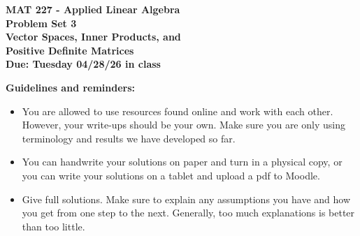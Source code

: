 \documentclass[12pt]{article}
\begin{document}
\begin{center}
\textbf{MAT 227 - Applied Linear Algebra}\\
\medskip
\textbf{Problem Set 3\\ Vector Spaces, Inner Products, and \\Positive Definite Matrices}\\
\medskip
\textbf{Due: {\color{red} Tuesday 04/28/26} in class}
\end{center}



\begin{center}
\underline{\hspace{6.5 in}}
\end{center}


\noindent\textbf{Guidelines and reminders:}
	\begin{itemize}[nosep]
	\item You are allowed to use resources found online and work with each other. However, your write-ups should be your own. Make sure you are only using terminology and results we have developed so far. 
	
	\medskip
	
	\item You can handwrite your solutions on paper and turn in a physical copy, or you can write your solutions on a tablet and upload a pdf to Moodle. 
		
	\medskip
			
	\item Give full solutions. Make sure to explain any assumptions you have and how you get from one step to the next. Generally, too much explanations is better than too little. 
	\end{itemize} 

\begin{center}
\underline{\hspace{6.5 in}}
\end{center}

\bigskip
\end{document}
